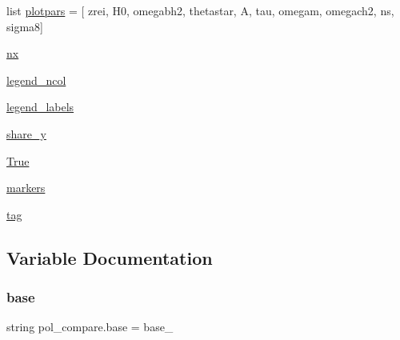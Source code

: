 \begin{DoxyCompactItemize}
\item 
list \mbox{\hyperlink{namespacepol__compare_a99f5ae846a44ea5cab883c2ea4614151}{plotpars}} = \mbox{[} \textquotesingle{}zrei\textquotesingle{}, \textquotesingle{}H0\textquotesingle{}, \textquotesingle{}omegabh2\textquotesingle{}, \textquotesingle{}thetastar\textquotesingle{}, \textquotesingle{}A\textquotesingle{}, \textquotesingle{}tau\textquotesingle{}, \textquotesingle{}omegam\textquotesingle{}, \textquotesingle{}omegach2\textquotesingle{}, \textquotesingle{}ns\textquotesingle{}, \textquotesingle{}sigma8\textquotesingle{}\mbox{]}
\item 
\mbox{\hyperlink{namespacepol__compare_ab6b100cc7bd1b403d30847e2a730b3fa}{nx}}
\item 
\mbox{\hyperlink{namespacepol__compare_a9c65538f933f1efbc899831bdf8c939c}{legend\+\_\+ncol}}
\item 
\mbox{\hyperlink{namespacepol__compare_a87f4e87d28a6c6ad058a400a0127337a}{legend\+\_\+labels}}
\item 
\mbox{\hyperlink{namespacepol__compare_a5e3fd999f7124eb8013da4a1ba5bf982}{share\+\_\+y}}
\item 
\mbox{\hyperlink{namespacepol__compare_a542d00a1259adfe271f0a26902c02358}{True}}
\item 
\mbox{\hyperlink{namespacepol__compare_a360481aa185f6dc085f0d585866739d9}{markers}}
\item 
\mbox{\hyperlink{namespacepol__compare_a581c34a7fbda02aab0c24580eb328f5f}{tag}}
\end{DoxyCompactItemize}


\subsection{Variable Documentation}
\mbox{\label{namespacepol__compare_a8ff59771278ec8aef743aaecde372138}} 
\subsubsection{\texorpdfstring{base}{base}}
{\footnotesize\ttfamily string pol\+\_\+compare.\+base = \textquotesingle{}base\+\_\+\textquotesingle{}}

\mbox{\label{namespacepol__compare_a51c9574c50b405f7b051e08d93459da2}} 
